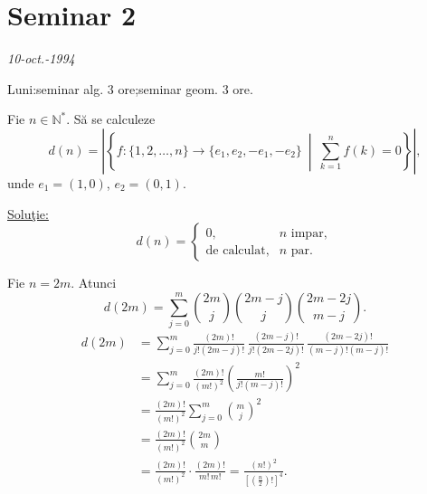 \section{Seminar 2}

\begin{center}
\end{center}
\begin{flushright}
\textit{10-oct.-1994}
\end{flushright}

\noindent Luni:\quad seminar alg. 3 ore;\quad seminar geom. 3 ore.

\bigskip
\noindent{}\quad Fie $n\in\mathbb{N}^{*}$. Să se calculeze
\[
 d(n)=\left|\left\{
 f:\{1,2,\ldots,n\}\longrightarrow\{e_1,e_2,-e_1,-e_2\}
 \ \middle|\ \sum_{k=1}^{n}f(k)=0
 \right\}\right|,
\]
\noindent unde $e_1=(1,0)$, $e_2=(0,1)$.

\medskip
\noindent\underline{Soluţie:}
\[
 d(n)=\begin{cases}
 0, & n\text{ impar},\\[2pt]
 \text{de calculat}, & n\text{ par}.
 \end{cases}
\]

\noindent Fie $n=2m$. Atunci
\[
 d(2m)=\sum_{j=0}^{m}
 \binom{2m}{j}\binom{2m-j}{j}\binom{2m-2j}{m-j}.
\]
\[
\begin{aligned}
 d(2m)
 &=\sum_{j=0}^{m}
 \frac{(2m)!}{j!(2m-j)!}\,
 \frac{(2m-j)!}{j!(2m-2j)!}\,
 \frac{(2m-2j)!}{(m-j)!(m-j)!}\\[4pt]
 &=\sum_{j=0}^{m}\frac{(2m)!}{(m!)^2}
 \left(\frac{m!}{j!(m-j)!}\right)^2\\[4pt]
 &=\frac{(2m)!}{(m!)^2}\sum_{j=0}^{m}\binom{m}{j}^{2}\\[4pt]
 &=\frac{(2m)!}{(m!)^2}\binom{2m}{m}\\[4pt]
 &=\frac{(2m)!}{(m!)^2}\cdot\frac{(2m)!}{m!\,m!}
 =\frac{(n!)^2}{\left[\left(\frac n2\right)!\right]^4}.
\end{aligned}
\]

